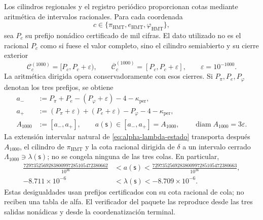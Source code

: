 Los cilindros regionales y el registro periódico proporcionan cotas mediante
aritmética de intervalos racionales. Para cada coordenada
\[
 c\in\{\pi_{\mathrm{HMT}},e_{\mathrm{HMT}},\varphi_{\mathrm{HMT}}\},
\]
sea \(P_c\) su prefijo nonádico certificado de mil cifras. El dato utilizado
no es el racional \(P_c\) como si fuese el valor completo, sino el cilindro
semiabierto y su cierre exterior
\[
 \mathcal C_c^{(1000)}=[P_c,P_c+\varepsilon),
 \qquad
 \overline{\mathcal C}_c^{(1000)}=[P_c,P_c+\varepsilon],
 \qquad \varepsilon=10^{-1000}.
\]
La aritmética dirigida opera conservadoramente con esos cierres. Si
\(P_\pi,P_e,P_\varphi\) denotan los tres prefijos, se obtiene
\begin{equation}
\begin{aligned}
 a_-&:=P_\pi+P_e-(P_\varphi+\varepsilon)-4-
       \kappa_{\mathrm{per}},\\
 a_+&:=(P_\pi+\varepsilon)+(P_e+\varepsilon)-P_\varphi-4-
       \kappa_{\mathrm{per}},\\
 A_{1000}&:=[a_-,a_+],
 \qquad a(\mathsf s)\in[a_-,a_+]=A_{1000},
 \qquad \operatorname{diam}A_{1000}=3\varepsilon.
\end{aligned}
\label{eq:alpha-propagacion-colas-rev08}
\end{equation}
La extensión intervalar natural de
\eqref{eq:alpha-lambda-estado} transporta después \(A_{1000}\), el cilindro
de \(\pi_{\mathrm{HMT}}\) y la cota racional dirigida de \(\delta\) a un
intervalo cerrado \(\Lambda_{1000}\ni\lambda(\mathsf s)\); no se congela
ninguna de las tres colas. En particular,
\begin{equation}
\begin{aligned}
 \frac{7297352569283800997285105472380662}{10^{36}}
 &<a(\mathsf s)<
 \frac{7297352569283800997285105472380663}{10^{36}},\\
 -8.711\mathbin{\times}10^{-6}
 &<\lambda(\mathsf s)<-8.709\mathbin{\times}10^{-6}.
\end{aligned}
 \label{eq:alpha-cotas-precoordenada-lambda}
\end{equation}
Estas desigualdades usan prefijos certificados con su cota racional de
cola; no reciben una tabla de alfa. El verificador del paquete las reproduce
desde las tres salidas nonádicas y desde la coordenatización terminal.

